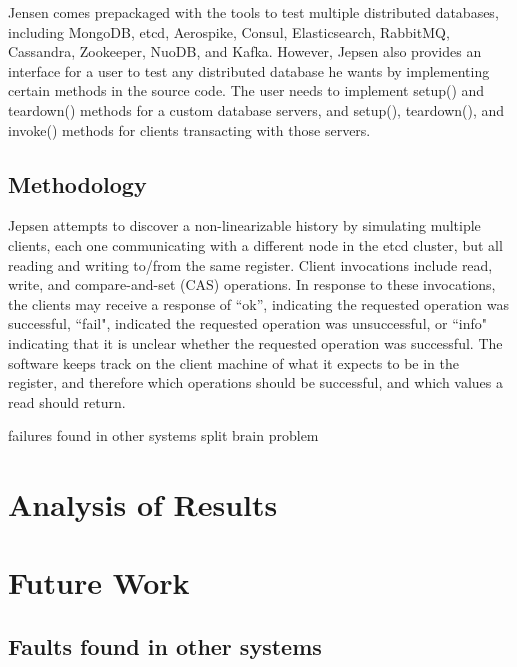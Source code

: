 \documentclass[12pt,conference]{IEEEtran}
\begin{document}
Jensen comes prepackaged with the tools to test multiple distributed databases, including MongoDB, etcd, Aerospike, Consul, Elasticsearch, RabbitMQ, Cassandra, Zookeeper, NuoDB, and Kafka. However, Jepsen also provides an interface for a user to test any distributed database he wants by implementing certain methods in the source code. The user needs to implement setup() and teardown() methods for a custom database servers, and setup(), teardown(), and invoke() methods for clients transacting with those servers.

\subsection{Methodology}

Jepsen attempts to discover a non-linearizable history by simulating multiple clients, each one communicating with a different node in the etcd cluster, but all reading and writing to/from the same register. Client invocations include read, write, and compare-and-set (CAS) operations. In response to these invocations, the clients may receive a response of ``ok'', indicating the requested operation was successful, ``fail", indicated the requested operation was unsuccessful, or ``info" indicating that it is unclear whether the requested operation was successful. The software keeps track on the client machine of what it expects to be in the register, and therefore which operations should be successful, and which values a read should return. 

failures found in other systems
split brain problem


\section{Analysis of Results}

\section{Future Work}
\subsection{Faults found in other systems}
\end{document}

